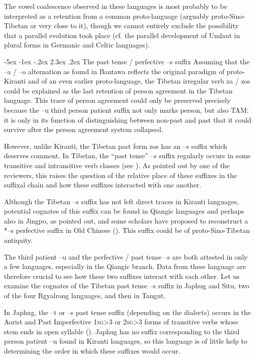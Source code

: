 \documentclass[oldfontcommands,twoside,a4paper,12pt]{memoir}
\makeatletter
\newcommand{\ipa}[1]{{\phon #1}}
\newcommand{\sg}{\textsc{sg}}
\renewcommand\section{\@startsection{section}{0}{\z@}%
                                   {-5ex \@plus -1ex \@minus -.2ex}%
                                   {2.3ex \@plus.2ex}%
                                   {\flushleft\large\bfseries}}
\makeatother
\begin{document}
The vowel coalescence observed in these languages is most probably to be interpreted as a retention from a common proto-language (arguably proto-Sino-Tibetan or very close to it), though we cannot entirely exclude  the possibility that a parallel evolution took place (cf. the parallel development of Umlaut in plural forms in Germanic and Celtic languages).

\section{The past tense / perfective --s suffix} \label{sec:s.suffix}
Assuming that the --a / --o alternation as found in Bantawa reflects the original paradigm of proto-Kiranti and of an even earlier proto-language, the Tibetan irregular verb \ipa{za} / \ipa{zos} could be explained as the last retention of person agreement in the Tibetan language. This trace of person agreement could only be preserved precisely because the --u third person patient suffix not only marks person, but also TAM: it is only in its function of distinguishing between non-past and past that it could survive after the person agreement system collapsed.

However, unlike Kiranti, the Tibetan past form \ipa{zos} has an --s suffix which deserves comment. In Tibetan, the ``past tense'' --s suffix regularly occurs in some transitive and intransitive verb classes (see \citealt{coblin76}). As pointed out by one of the reviewers, this raises the question of the relative place of these suffixes in the suffixal chain and how these suffixes interacted  with one another.

Although the Tibetan --s suffix has not left direct traces in Kiranti languages, potential cognates of this suffix can be found in Qiangic languages and perhaps also in Jingpo, as \citet{huangbf97s.houzhui} pointed out, and some scholars have proposed to reconstruct a *--s perfective suffix in Old Chinese (\citealt{jinlx06}). This suffix could be of proto-Sino-Tibetan antiquity. 

The third patient --u and the perfective / past tense --s are both attested in only a few languages, especially in the Qiangic branch. Data from these language are therefore crucial to see how these two suffixes interact with each other. Let us  examine the cognates of the Tibetan past tense --s suffix in Japhug and Situ, two of the four Rgyalrong languages, and then in Tangut.

In Japhug, the --t or --s past tense suffix (depending on the dialects) occurs in the Aorist and Past Imperfective 1\sg{}>3 or 2\sg{}>3 forms of transitive verbs whose stem ends in open syllable (\citealt[p. 136]{jacques10inverse}). Japhug has no suffix corresponding to the third person patient --u found in Kiranti languages, so this language is of little help to determining the order in which these suffixes would occur.
\end{document}
